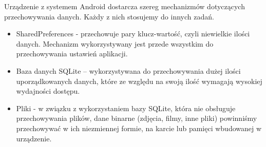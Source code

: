 Urządzenie z systemem Android dostarcza szereg mechanizmów dotyczących przechowywania danych. Każdy z nich stosujemy do innych zadań.

\begin{itemize}
\item SharedPreferences - przechowuje pary klucz-wartość, czyli niewielkie ilości danych. Mechanizm wykorzystywany jest przede wszystkim do przechowywania ustawień aplikacji.\cite{tutorial:sqlite}
\item Baza danych SQLite – wykorzystywana do przechowywania dużej ilości uporządkowanych danych, które ze względu na swoją ilość wymagają wysokiej wydajności dostępu.\cite{tutorial:sqlite}
\item Pliki - w związku z wykorzystaniem bazy SQLite, która nie obsługuje przechowywania plików, dane binarne (zdjęcia, filmy, inne pliki) powinniśmy przechowywać w ich niezmiennej formie, na karcie lub pamięci wbudowanej w urządzenie.\cite{tutorial:sqlite}
\end{itemize}









